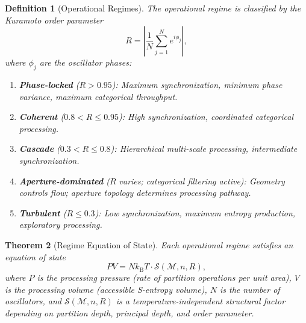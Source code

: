\documentclass[twocolumn,10pt]{article}
\newtheorem{theorem}{Theorem}[section]
\newtheorem{definition}[theorem]{Definition}
\theoremstyle{remark}
\newcommand{\kB}{k_{\mathrm{B}}}
\newcommand{\Depth}{\mathcal{M}}
\begin{document}
\begin{definition}[Operational Regimes]
\label{def:regimes}
The operational regime is classified by the Kuramoto order parameter \cite{kuramoto1984}
\begin{equation}
R = \left|\frac{1}{N}\sum_{j=1}^N e^{i\phi_j}\right|,
\label{eq:kuramoto}
\end{equation}
where $\phi_j$ are the oscillator phases:
\begin{enumerate}
\item \textbf{Phase-locked} ($R > 0.95$): Maximum synchronization, minimum phase variance, maximum categorical throughput.
\item \textbf{Coherent} ($0.8 < R \leq 0.95$): High synchronization, coordinated categorical processing.
\item \textbf{Cascade} ($0.3 < R \leq 0.8$): Hierarchical multi-scale processing, intermediate synchronization.
\item \textbf{Aperture-dominated} ($R$ varies; categorical filtering active): Geometry controls flow; aperture topology determines processing pathway.
\item \textbf{Turbulent} ($R \leq 0.3$): Low synchronization, maximum entropy production, exploratory processing.
\end{enumerate}
\end{definition}

\begin{theorem}[Regime Equation of State]
\label{thm:regime_eos}
Each operational regime satisfies an equation of state
\begin{equation}
PV = N\kB T \cdot \mathcal{S}(\Depth, n, R),
\label{eq:eos}
\end{equation}
where $P$ is the processing pressure (rate of partition operations per unit area), $V$ is the processing volume (accessible S-entropy volume), $N$ is the number of oscillators, and $\mathcal{S}(\Depth, n, R)$ is a temperature-independent structural factor depending on partition depth, principal depth, and order parameter.
\end{theorem}
\end{document}
